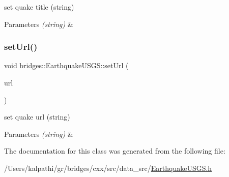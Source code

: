 set quake title (string)


\begin{DoxyParams}{Parameters}
{\em (string)} & \\
\hline
\end{DoxyParams}
\mbox{\label{classbridges_1_1_earthquake_u_s_g_s_a4ee05f6d980ba3101f598c6cfd04fdf2}} 
\subsubsection{\texorpdfstring{setUrl()}{setUrl()}}
{\footnotesize\ttfamily void bridges\+::\+Earthquake\+U\+S\+G\+S\+::set\+Url (\begin{DoxyParamCaption}\item[{const string \&}]{url }\end{DoxyParamCaption})\hspace{0.3cm}{\ttfamily [inline]}}

set quake url (string)


\begin{DoxyParams}{Parameters}
{\em (string)} & \\
\hline
\end{DoxyParams}


The documentation for this class was generated from the following file\+:\begin{DoxyCompactItemize}
\item 
/\+Users/kalpathi/gr/bridges/cxx/src/data\+\_\+src/\mbox{\hyperlink{_earthquake_u_s_g_s_8h}{Earthquake\+U\+S\+G\+S.\+h}}\end{DoxyCompactItemize}

